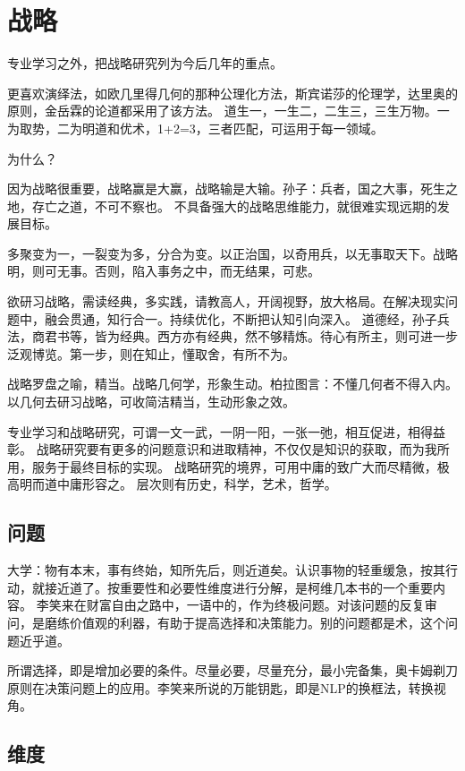 \chapter{战略}

专业学习之外，把战略研究列为今后几年的重点。

更喜欢演绎法，如欧几里得几何的那种公理化方法，斯宾诺莎的伦理学，达里奥的原则，金岳霖的论道都采用了该方法。
道生一，一生二，二生三，三生万物。一为取势，二为明道和优术，1+2=3，三者匹配，可运用于每一领域。


为什么？

因为战略很重要，战略赢是大赢，战略输是大输。孙子：兵者，国之大事，死生之地，存亡之道，不可不察也。
不具备强大的战略思维能力，就很难实现远期的发展目标。

多聚变为一，一裂变为多，分合为变。以正治国，以奇用兵，以无事取天下。战略明，则可无事。否则，陷入事务之中，而无结果，可悲。

欲研习战略，需读经典，多实践，请教高人，开阔视野，放大格局。在解决现实问题中，融会贯通，知行合一。持续优化，不断把认知引向深入。
道德经，孙子兵法，商君书等，皆为经典。西方亦有经典，然不够精炼。待心有所主，则可进一步泛观博览。第一步，则在知止，懂取舍，有所不为。

战略罗盘之喻，精当。战略几何学，形象生动。柏拉图言：不懂几何者不得入内。以几何去研习战略，可收简洁精当，生动形象之效。

专业学习和战略研究，可谓一文一武，一阴一阳，一张一弛，相互促进，相得益彰。
战略研究要有更多的问题意识和进取精神，不仅仅是知识的获取，而为我所用，服务于最终目标的实现。
战略研究的境界，可用中庸的致广大而尽精微，极高明而道中庸形容之。
层次则有历史，科学，艺术，哲学。

\section{问题}

大学：物有本末，事有终始，知所先后，则近道矣。认识事物的轻重缓急，按其行动，就接近道了。按重要性和必要性维度进行分解，是柯维几本书的一个重要内容。
李笑来在财富自由之路中，一语中的，作为终极问题。对该问题的反复审问，是磨练价值观的利器，有助于提高选择和决策能力。别的问题都是术，这个问题近乎道。

所谓选择，即是增加必要的条件。尽量必要，尽量充分，最小完备集，奥卡姆剃刀原则在决策问题上的应用。李笑来所说的万能钥匙，即是NLP的换框法，转换视角。

\section{维度}


